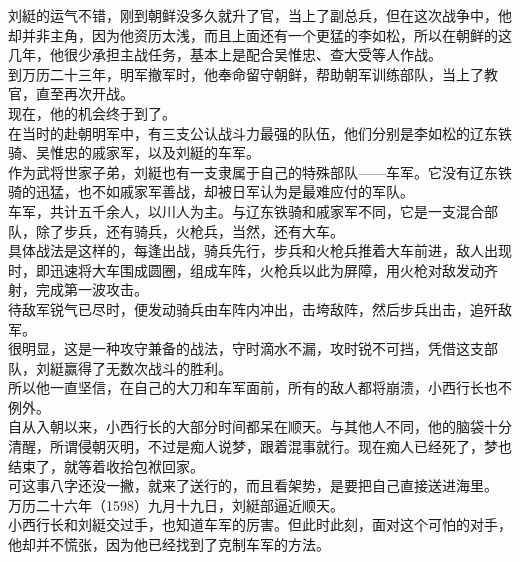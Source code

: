 \begin{multicols}{\theparacolNo}
刘綎的运气不错，刚到朝鲜没多久就升了官，当上了副总兵，但在这次战争中，他却并非主角，因为他资历太浅，而且上面还有一个更猛的李如松，所以在朝鲜的这几年，他很少承担主战任务，基本上是配合吴惟忠、查大受等人作战。\\

到万历二十三年，明军撤军时，他奉命留守朝鲜，帮助朝军训练部队，当上了教官，直至再次开战。\\

现在，他的机会终于到了。\\

在当时的赴朝明军中，有三支公认战斗力最强的队伍，他们分别是李如松的辽东铁骑、吴惟忠的戚家军，以及刘綎的车军。\\

作为武将世家子弟，刘綎也有一支隶属于自己的特殊部队——车军。它没有辽东铁骑的迅猛，也不如戚家军善战，却被日军认为是最难应付的军队。\\

车军，共计五千余人，以川人为主。与辽东铁骑和戚家军不同，它是一支混合部队，除了步兵，还有骑兵，火枪兵，当然，还有大车。\\

具体战法是这样的，每逢出战，骑兵先行，步兵和火枪兵推着大车前进，敌人出现时，即迅速将大车围成圆圈，组成车阵，火枪兵以此为屏障，用火枪对敌发动齐射，完成第一波攻击。\\

待敌军锐气已尽时，便发动骑兵由车阵内冲出，击垮敌阵，然后步兵出击，追歼敌军。\\

很明显，这是一种攻守兼备的战法，守时滴水不漏，攻时锐不可挡，凭借这支部队，刘綎赢得了无数次战斗的胜利。\\

所以他一直坚信，在自己的大刀和车军面前，所有的敌人都将崩溃，小西行长也不例外。\\

自从入朝以来，小西行长的大部分时间都呆在顺天。与其他人不同，他的脑袋十分清醒，所谓侵朝灭明，不过是痴人说梦，跟着混事就行。现在痴人已经死了，梦也结束了，就等着收拾包袱回家。\\

可这事八字还没一撇，就来了送行的，而且看架势，是要把自己直接送进海里。\\

万历二十六年（1598）九月十九日，刘綎部逼近顺天。\\

小西行长和刘綎交过手，也知道车军的厉害。但此时此刻，面对这个可怕的对手，他却并不慌张，因为他已经找到了克制车军的方法。\\


\end{multicols}
